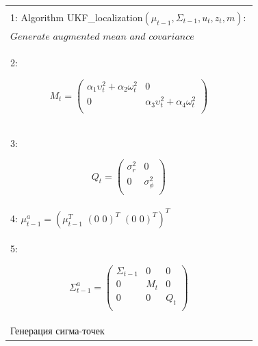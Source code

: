 \documentclass[10pt,a4paper]{article}
\begin{document}
\begin{table}[H]
\begin{center}
\begin{tabular}{|l|}
\hline
{}\\
1: Algorithm UKF\_localization$(\mu_{t-1},\varSigma_{t-1},u_t,z_t,m):$ \\
\hspace{3mm}$\textit{Generate augmented mean and covariance}$\\
2:\hspace{5mm}
\begin{minipage}{0.2\textwidth}
\begin{equation*}
M_t=
\left(\begin{array}{cc}
\alpha_1\upsilon_t^2+\alpha_2\omega_t^2&0\\
0&\alpha_3\upsilon_t^2+\alpha_4\omega_t^2\\
\end{array}\right)
\end{equation*}
\end{minipage}\\
3:\hspace{5mm}
\begin{minipage}{0.2\textwidth}
\begin{equation*}
Q_t=
\left(\begin{array}{cc}
\sigma^2_r&0\\
0&\sigma^2_\phi\\
\end{array}\right)
\end{equation*}
\end{minipage}\\
4:\hspace{5mm}
$\mu_{t-1}^a=(\mu_{t-1}^T\,\,(0\,\,0)^T\,\,(0\,\,0)^T)^T$\\
5:\hspace{5mm}
\begin{minipage}{0.2\textwidth}
\begin{equation*}
\varSigma_{t-1}^a=
\left(\begin{array}{ccc}
\varSigma_{t-1}&0&0\\
0&M_t&0\\
0&0&Q_t\\
\end{array}\right)
\end{equation*}
\end{minipage}\\
\hspace{3mm}$\textit{Генерация сигма-точек}$\\

\end{tabular}
\end{center}
\end{table}
\end{document}
